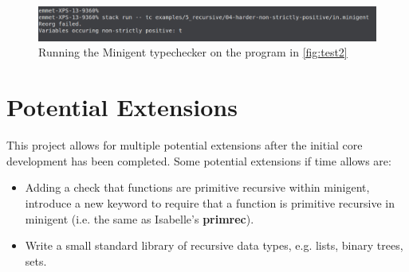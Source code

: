 \begin{figure}
    \centering
    \includegraphics[width=\linewidth]{content/test2result.png}
    \caption{Running the Minigent typechecker on the program in \autoref{fig:test2}}
    \label{fig:test2result}
\end{figure}

\section{Potential Extensions}
\label{sec:proposedextensions}

This project allows for multiple potential extensions after the initial core development has been completed.
Some potential extensions if time allows are:

\begin{itemize}
    \item Adding a check that functions are primitive recursive within minigent, introduce a new keyword
          to require that a function is primitive recursive in minigent (i.e. the same as
          Isabelle's \textbf{primrec}).
    \item Write a small standard library of recursive data types, e.g. lists, binary trees, 
          sets.
\end{itemize}